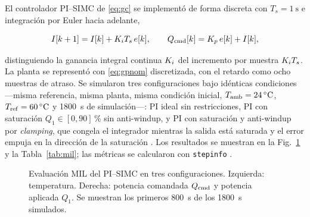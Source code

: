 El controlador PI--SIMC de \eqref{eq:gc} se implementó de forma discreta con $T_s = \SI{1}{\second}$ e
integración por Euler hacia adelante,

\begin{equation}
I[k+1] = I[k] + K_i T_s\, e[k],
\qquad
Q_{\mathrm{cmd}}[k] = K_p\, e[k] + I[k],
\label{eq:pidiscreto}
\end{equation}

distinguiendo la ganancia integral continua $K_i$ del incremento por muestra $K_i T_s$. La planta se
representó con \eqref{eq:gpnom} discretizada, con el retardo como ocho muestras de atraso. Se
simularon tres configuraciones bajo idénticas condiciones ---misma referencia, misma planta, misma
condición inicial, $T_{\mathrm{amb}} = \SI{24}{\celsius}$, $T_{\mathrm{ref}} = \SI{60}{\celsius}$ y
\SI{1800}{\second} de simulación---: PI ideal sin restricciones, PI con saturación
$Q_1 \in [0,90]\,\si{\percent}$ sin anti-windup, y PI con saturación y anti-windup por
\emph{clamping}, que congela el integrador mientras la salida está saturada y el error empuja en
la dirección de la saturación \cite{mw_antiwindup}. Los resultados se muestran en la
Fig.~\ref{fig:mil} y la Tabla~\ref{tab:mil}; las métricas se calcularon con \texttt{stepinfo}
\cite{mw_stepinfo}.

\begin{figure}[!t]
\centering
{}
\caption{Evaluación MIL del PI--SIMC en tres configuraciones. Izquierda: temperatura. Derecha:
potencia comandada $Q_{\mathrm{cmd}}$ y potencia aplicada $Q_1$. Se muestran los primeros
\SI{800}{\second} de los \SI{1800}{\second} simulados.}
\label{fig:mil}
\end{figure}

